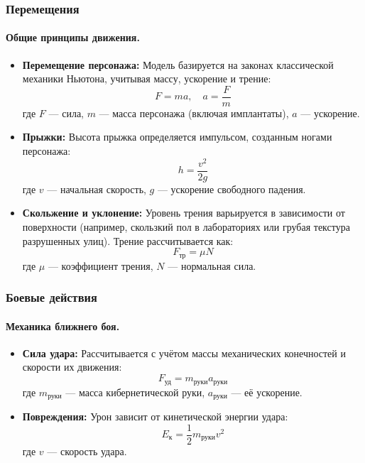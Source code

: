 \documentclass{article}
\begin{document}
\subsubsection{Перемещения}

\paragraph{Общие принципы движения.}
\begin{itemize}
    \item \textbf{Перемещение персонажа:} Модель базируется на законах классической механики Ньютона, учитывая массу, ускорение и трение:
    \[
    F = ma, \quad a = \frac{F}{m}
    \]
    где \(F\) — сила, \(m\) — масса персонажа (включая имплантаты), \(a\) — ускорение. 
    \item \textbf{Прыжки:} Высота прыжка определяется импульсом, созданным ногами персонажа:
    \[
    h = \frac{v^2}{2g}
    \]
    где \(v\) — начальная скорость, \(g\) — ускорение свободного падения.
    \item \textbf{Скольжение и уклонение:} Уровень трения варьируется в зависимости от поверхности (например, скользкий пол в лабораториях или грубая текстура разрушенных улиц). Трение рассчитывается как:
    \[
    F_\text{тр} = \mu N
    \]
    где \(\mu\) — коэффициент трения, \(N\) — нормальная сила.
\end{itemize}

\subsubsection{Боевые действия}

\paragraph{Механика ближнего боя.}
\begin{itemize}
    \item \textbf{Сила удара:} Рассчитывается с учётом массы механических конечностей и скорости их движения:
    \[
    F_\text{уд} = m_\text{руки} a_\text{руки}
    \]
    где \(m_\text{руки}\) — масса кибернетической руки, \(a_\text{руки}\) — её ускорение.
    \item \textbf{Повреждения:} Урон зависит от кинетической энергии удара:
    \[
    E_\text{к} = \frac{1}{2} m_\text{руки} v^2
    \]
    где \(v\) — скорость удара.
\end{itemize}
\end{document}
